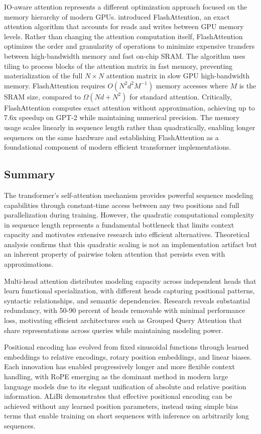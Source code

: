 IO-aware attention represents a different optimization approach focused on the memory hierarchy of modern GPUs. \citet{dao2022flashattention} introduced FlashAttention, an exact attention algorithm that accounts for reads and writes between GPU memory levels. Rather than changing the attention computation itself, FlashAttention optimizes the order and granularity of operations to minimize expensive transfers between high-bandwidth memory and fast on-chip SRAM. The algorithm uses tiling to process blocks of the attention matrix in fast memory, preventing materialization of the full $N \times N$ attention matrix in slow GPU high-bandwidth memory. FlashAttention requires $O(N^2 d^2 M^{-1})$ memory accesses where $M$ is the SRAM size, compared to $\Omega(Nd + N^2)$ for standard attention. Critically, FlashAttention computes exact attention without approximation, achieving up to 7.6x speedup on GPT-2 while maintaining numerical precision. The memory usage scales linearly in sequence length rather than quadratically, enabling longer sequences on the same hardware and establishing FlashAttention as a foundational component of modern efficient transformer implementations.

\subsection{Summary}

The transformer's self-attention mechanism provides powerful sequence modeling capabilities through constant-time access between any two positions and full parallelization during training. However, the quadratic computational complexity in sequence length represents a fundamental bottleneck that limits context capacity and motivates extensive research into efficient alternatives. Theoretical analysis confirms that this quadratic scaling is not an implementation artifact but an inherent property of pairwise token attention that persists even with approximations.

Multi-head attention distributes modeling capacity across independent heads that learn functional specialization, with different heads capturing positional patterns, syntactic relationships, and semantic dependencies. Research reveals substantial redundancy, with 50-90 percent of heads removable with minimal performance loss, motivating efficient architectures such as Grouped Query Attention that share representations across queries while maintaining modeling power.

Positional encoding has evolved from fixed sinusoidal functions through learned embeddings to relative encodings, rotary position embeddings, and linear biases. Each innovation has enabled progressively longer and more flexible context handling, with RoPE emerging as the dominant method in modern large language models due to its elegant unification of absolute and relative position information. ALiBi demonstrates that effective positional encoding can be achieved without any learned position parameters, instead using simple bias terms that enable training on short sequences with inference on arbitrarily long sequences.

